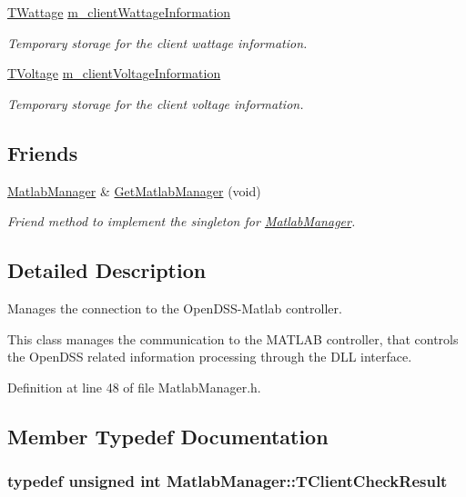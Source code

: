 \begin{DoxyCompactItemize}
\hyperlink{class_matlab_manager_a410b78f356aeacba5c43efee93d8c27d}{T\-Wattage} \hyperlink{class_matlab_manager_af4c255ddf41fda74a77367a17520d21f}{m\-\_\-client\-Wattage\-Information}
\begin{DoxyCompactList}\small\item\em Temporary storage for the client wattage information. \end{DoxyCompactList}\item 
\hyperlink{class_matlab_manager_a716643f4f29af3225aedf52d61fd0abe}{T\-Voltage} \hyperlink{class_matlab_manager_abf48a413742f5d98d4a13c68b60d9e83}{m\-\_\-client\-Voltage\-Information}
\begin{DoxyCompactList}\small\item\em Temporary storage for the client voltage information. \end{DoxyCompactList}\end{DoxyCompactItemize}
\subsection*{Friends}
\begin{DoxyCompactItemize}
\item 
\hyperlink{class_matlab_manager}{Matlab\-Manager} \& \hyperlink{class_matlab_manager_adf11a697c41ba15207a66f8d2b567b75}{Get\-Matlab\-Manager} (void)
\begin{DoxyCompactList}\small\item\em Friend method to implement the singleton for \hyperlink{class_matlab_manager}{Matlab\-Manager}. \end{DoxyCompactList}\end{DoxyCompactItemize}


\subsection{Detailed Description}
Manages the connection to the Open\-D\-S\-S-\/\-Matlab controller. 

This class manages the communication to the M\-A\-T\-L\-A\-B controller, that controls the Open\-D\-S\-S related information processing through the D\-L\-L interface. 

Definition at line 48 of file Matlab\-Manager.\-h.



\subsection{Member Typedef Documentation}
\hypertarget{class_matlab_manager_ac04dd0e7a4ab2efafe9604da5d44b318}{
\subsubsection[{T\-Client\-Check\-Result}]{\setlength{\rightskip}{0pt plus 5cm}typedef unsigned int {\bf Matlab\-Manager\-::\-T\-Client\-Check\-Result}\hspace{0.3cm}{\ttfamily [private]}}}\label{class_matlab_manager_ac04dd0e7a4ab2efafe9604da5d44b318}


